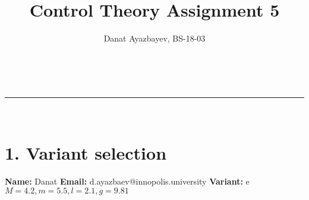 \documentclass[a4paper,11pt]{article}
\makeatletter
\newcommand{\linia}{\rule{\linewidth}{0.5pt}}
\theoremstyle{mytheor}
\renewcommand{\maketitle}{
\begin{center}
\vspace{2ex}
{\huge \textsc{\@title}}
\vspace{1ex}
\\
\linia\\
\@author \hfill \@date
\vspace{4ex}
\end{center}
}
\makeatother
\begin{document}
\title{Control Theory Assignment \textnumero{} 5}

\author{Danat Ayazbayev, BS-18-03}

\maketitle

\section*{1. Variant selection}
\textbf{Name:} Danat\newline
\textbf{Email: } d.ayazbaev@innopolis.university\newline
\textbf{Variant: } e\newline
$M=4.2,m=5.5,l=2.1,g=9.81$
\end{document}
